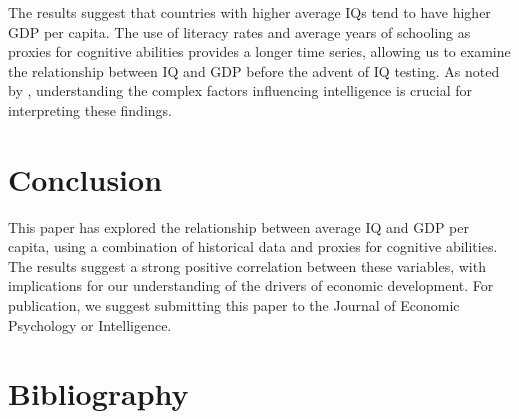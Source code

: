 \documentclass{article}
\begin{document}
The results suggest that countries with higher average IQs tend to have higher GDP per capita. The use of literacy rates and average years of schooling as proxies for cognitive abilities provides a longer time series, allowing us to examine the relationship between IQ and GDP before the advent of IQ testing. As noted by \cite{neisser1996intelligence}, understanding the complex factors influencing intelligence is crucial for interpreting these findings.

\section{Conclusion}

This paper has explored the relationship between average IQ and GDP per capita, using a combination of historical data and proxies for cognitive abilities. The results suggest a strong positive correlation between these variables, with implications for our understanding of the drivers of economic development. For publication, we suggest submitting this paper to the Journal of Economic Psychology or Intelligence.

\section{Bibliography}



\end{document}
